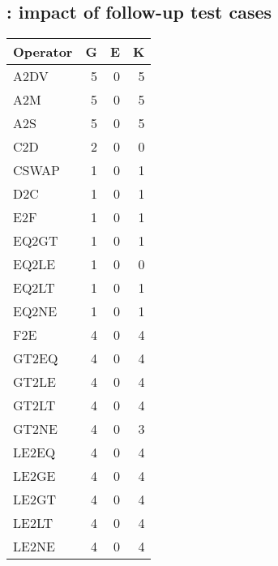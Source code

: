 \subsection{\rqmetamorphic: impact of follow-up test cases}
%
\begin{table}
    \centering
    \begin{tabular}{lrrr}
    \toprule
    \textbf{Operator} & \textbf{G} & \textbf{E} & \textbf{K} \\
    \midrule
A2DV    &       5       &       0       &       5       \\
A2M         &   5       &       0       &       5       \\
A2S         &   5       &       0       &       5       \\
C2D         &   2       &       0       &       0       \\
CSWAP   &       1       &       0       &       1       \\
D2C         &   1       &       0       &       1       \\
E2F         &   1       &       0       &       1       \\
EQ2GT   &       1       &       0       &       1       \\
EQ2LE   &       1       &       0       &       0       \\
EQ2LT   &       1       &       0       &       1       \\
EQ2NE   &       1       &       0       &       1       \\
F2E      &      4       &       0       &       4       \\
GT2EQ   &       4       &       0       &       4       \\
GT2LE   &       4       &       0       &       4       \\
GT2LT   &       4       &       0       &       4       \\
GT2NE   &       4       &       0       &       3       \\
LE2EQ   &       4       &       0       &       4       \\
LE2GE   &       4       &       0       &       4       \\
LE2GT   &       4       &       0       &       4       \\
LE2LT   &       4       &       0       &       4       \\
LE2NE   &       4       &       0       &       4       \\

\end{tabular}
\end{table}
